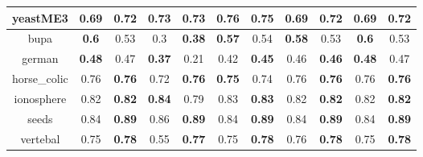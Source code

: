 \documentclass{article}%
\begin{document}
\begin{tabular}{c|cccccccccc}
\hline%
yeastME3&0.69&\textbf{0.72}&0.73&\textbf{0.73}&\textbf{0.76}&0.75&0.69&\textbf{0.72}&0.69&\textbf{0.72}\\%
\hline%
bupa&\textbf{0.6}&0.53&0.3&\textbf{0.38}&\textbf{0.57}&0.54&\textbf{0.58}&0.53&\textbf{0.6}&0.53\\%
\hline%
german&\textbf{0.48}&0.47&\textbf{0.37}&0.21&0.42&\textbf{0.45}&0.46&\textbf{0.46}&\textbf{0.48}&0.47\\%
\hline%
horse\_colic&0.76&\textbf{0.76}&0.72&\textbf{0.76}&\textbf{0.75}&0.74&0.76&\textbf{0.76}&0.76&\textbf{0.76}\\%
\hline%
ionosphere&0.82&\textbf{0.82}&\textbf{0.84}&0.79&0.83&\textbf{0.83}&0.82&\textbf{0.82}&0.82&\textbf{0.82}\\%
\hline%
seeds&0.84&\textbf{0.89}&0.86&\textbf{0.89}&0.84&\textbf{0.89}&0.84&\textbf{0.89}&0.84&\textbf{0.89}\\%
\hline%
vertebal&0.75&\textbf{0.78}&0.55&\textbf{0.77}&0.75&\textbf{0.78}&0.76&\textbf{0.78}&0.75&\textbf{0.78}\\%
\hline%
\end{tabular}

%
\end{document}
